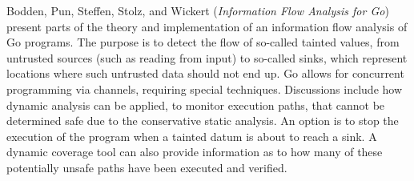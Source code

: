 

Bodden, Pun, Steffen, Stolz, and Wickert
\cite{isola-2016-bodden}
({\em Information Flow Analysis for Go})
present parts of the theory and implementation of 
an information flow analysis of Go programs. The purpose is
to detect the flow of so-called tainted values, from untrusted sources (such as reading from input) to so-called sinks, 
which represent locations where such untrusted data should not end up.  Go allows for concurrent programming via channels, requiring
special techniques. Discussions include how dynamic analysis can be
applied, to monitor execution paths, that cannot be determined safe due to the conservative static analysis. An option is to stop the execution of
the program when a tainted datum is about to reach a sink.
A dynamic coverage tool can also provide information
as to how many of these potentially unsafe paths have been executed and verified.

